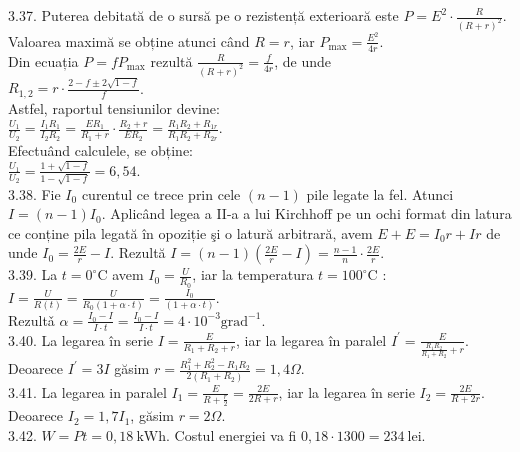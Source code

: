 3.37. Puterea debitată de o sursă pe o rezistență exterioară este $P=E^{2} \cdot \frac{R}{(R+r)^{2}}$.\\ Valoarea maximă se obține atunci când $R=r$, iar $P_{\max }=\frac{E^{2}}{4 r}$.\\ Din ecuația $P=f P_{\max }$ rezultă $\frac{R}{(R+r)^{2}}=\frac{f}{4 r}$, de unde\\ $R_{1,2}=r \cdot \frac{2-f \pm 2 \sqrt{1-f}}{f}$.\\ Astfel, raportul tensiunilor devine:\\ $\frac{U_{1}}{U_{2}}=\frac{I_{1} R_{1}}{I_{2} R_{2}}=\frac{E R_{1}}{R_{1}+r} \cdot \frac{R_{2}+r}{E R_{2}}=\frac{R_{1} R_{2}+R_{1 r}}{R_{1} R_{2}+R_{2 r}} .$\\ Efectuând calculele, se obține:\\ $\frac{U_{1}}{U_{2}}=\frac{1+\sqrt{1-f}}{1-\sqrt{1-f}}=6,54$.\\

3.38. Fie $I_{0}$ curentul ce trece prin cele $(n-1)$ pile legate la fel. Atunci $I=(n-1) I_{0}$. Aplicând legea a II-a a lui Kirchhoff pe un ochi format din latura ce conține pila legată în opoziție şi o latură arbitrară, avem $E+E=I_{0} r+I r$ de unde $I_{0}=\frac{2 E}{r}-I$. Rezultă $I=(n-1)\left(\frac{2 E}{r}-I\right)=\frac{n-1}{n} \cdot \frac{2 E}{r}$.\\

3.39. La $t=0^{\circ} \mathrm{C}$ avem $I_{0}=\frac{U}{R_{0}}$, iar la temperatura $t=100^{\circ} \mathrm{C}$ :\\ $I=\frac{U}{R(t)}=\frac{U}{R_{0}(1+\alpha \cdot t)}=\frac{I_{0}}{(1+\alpha \cdot t)}$.\\ Rezultǎ $\alpha=\frac{I_{0}-I}{I \cdot t}=\frac{I_{0}-I}{I \cdot t}=4 \cdot 10^{-3} \mathrm{grad}^{-1}$.\\

3.40. La legarea în serie $I=\frac{E}{R_{1}+R_{2}+r}$, iar la legarea în paralel $I^{\prime}=\frac{E}{\frac{R_{1} R_{2}}{R_{1}+R_{2}}+r}$. Deoarece $I^{\prime}=3 I$ găsim $r=\frac{R_{1}^{2}+R_{2}^{2}-R_{1} R_{2}}{2\left(R_{1}+R_{2}\right)}=1,4 \Omega$.\\

3.41. La legarea in paralel $I_{1}=\frac{E}{R+\frac{r}{2}}=\frac{2 E}{2 R+r}$, iar la legarea în serie $I_{2}=\frac{2 E}{R+2 r}$. Deoarece $I_{2}=1,7 I_{1}$, găsim $r=2 \Omega$.\\

3.42. $W=P t=0,18 \mathrm{~kWh}$. Costul energiei va fi $0,18 \cdot 1300=234 \mathrm{~lei}$.\\


